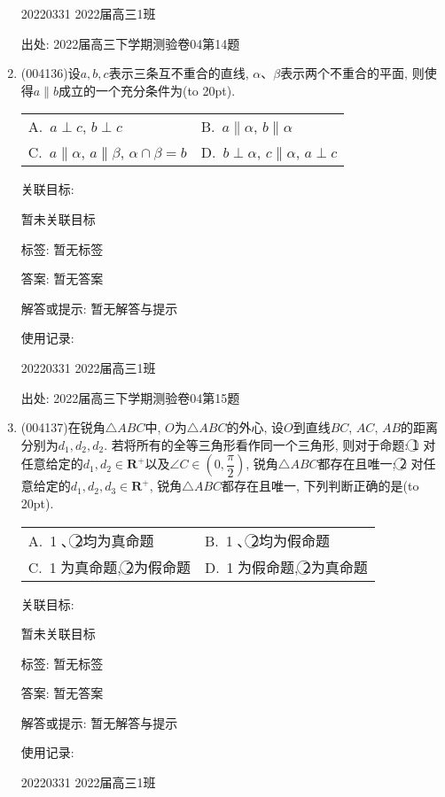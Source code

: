 \documentclass[10pt,a4paper]{article}
\newcommand{\bracket}[1]{(\hbox to #1pt{})}
\newcommand{\twoch}[4]{\par\begin{tabular}{p{.46\textwidth}p{.46\textwidth}}
A.~#1& B.~#2\\
C.~#3& D.~#4
\end{tabular}}
\begin{document}
\begin{enumerate}[1.]
20220331	2022届高三1班	


出处: 2022届高三下学期测验卷04第14题
\item { (004136)}设$a,b,c$表示三条互不重合的直线, $\alpha$、$\beta$表示两个不重合的平面, 则使得$a\parallel b$成立的一个充分条件为\bracket{20}.
\twoch{$a\perp c$, $b\perp c$}{$a\parallel \alpha$, $b\parallel \alpha$}{$a\parallel \alpha$, $a\parallel \beta$, $\alpha\cap \beta = b$}{$b\perp \alpha$, $c\parallel \alpha$, $a\perp c$}


关联目标:

暂未关联目标



标签: 暂无标签

答案: 暂无答案

解答或提示: 暂无解答与提示

使用记录:

20220331	2022届高三1班	


出处: 2022届高三下学期测验卷04第15题
\item { (004137)}在锐角$\triangle ABC$中, $O$为$\triangle ABC$的外心, 设$O$到直线$BC$, $AC$, $AB$的距离分别为$d_1,d_2,d_2$. 若将所有的全等三角形看作同一个三角形, 则对于命题: \textcircled{1} 对任意给定的$d_1,d_2\in \mathbf{R}^+$以及$\angle C\in (0,\dfrac\pi 2)$, 锐角$\triangle ABC$都存在且唯一; \textcircled{2} 对任意给定的$d_1,d_2,d_3\in \mathbf{R}^+$, 锐角$\triangle ABC$都存在且唯一, 下列判断正确的是\bracket{20}.
\twoch{\textcircled{1}、\textcircled{2}均为真命题}{\textcircled{1}、\textcircled{2}均为假命题}{\textcircled{1}为真命题, \textcircled{2}为假命题}{\textcircled{1}为假命题, \textcircled{2}为真命题}


关联目标:

暂未关联目标



标签: 暂无标签

答案: 暂无答案

解答或提示: 暂无解答与提示

使用记录:

20220331	2022届高三1班	



\end{enumerate}
\end{document}
